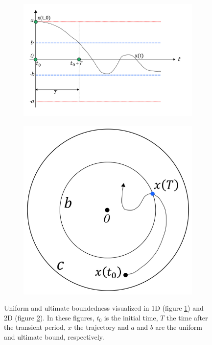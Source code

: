 \begin{figure}
  \centering
  \begin{subfigure}[c]{0.55\textwidth}
    \centering
    \includegraphics[width=\linewidth]{figures/figure-bounce.jpg}
    \caption{} \label{fig:boundedness_2D}
  \end{subfigure}
  \hspace{4mm}
  \begin{subfigure}[c]{0.31\textwidth}
    \centering
    \includegraphics[width=\linewidth]{figures/figure-uub.jpg}
    \caption{} \label{fig:boundedness_3D}
  \end{subfigure}%

  \caption[Visualization of uniform and ultimate boundedness.]{Uniform and ultimate boundedness visualized in 1D (figure \ref{fig:boundedness_2D}) and 2D (figure \ref{fig:boundedness_3D}). In these figures, $t_0$ is the initial time, $T$ the time after the transient period, $x$ the trajectory and $a$ and $b$ are the uniform and ultimate bound, respectively.} \label{fig:boundedness_notions}
\end{figure}

